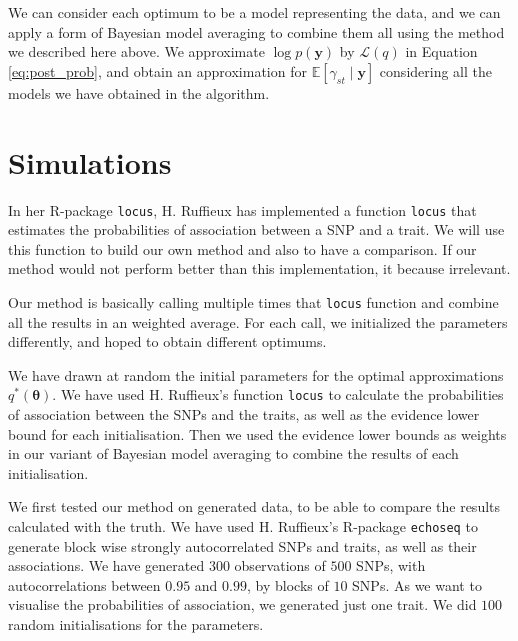 \documentclass[a4paper, 11pt]{report}
\numberwithin{equation}{section}
\begin{document}
We can consider each optimum to be a model representing the data, and we can apply a form of Bayesian model averaging to combine them all using the method we described here above. We approximate $\log p(\boldsymbol{y})$ by $\mathcal{L}(q)$ in Equation \ref{eq:post_prob}, and obtain an approximation for $\mathbb{E}\left[\gamma_{st}\mid \boldsymbol{y}\right]$ considering all the models we have obtained in the algorithm.
\newpage
\chapter{Simulations}
In her R-package \texttt{locus}, H. Ruffieux has implemented a function \texttt{locus} that estimates the probabilities of association between a SNP and a trait. We will use this function to build our own method and also to have a comparison. If our method would not perform better than this implementation, it because irrelevant.

Our method is basically calling multiple times that \texttt{locus} function and combine all the results in an weighted average. For each call, we initialized the parameters differently, and hoped to obtain different optimums.

We have drawn at random the initial parameters for the optimal approximations $q^*(\boldsymbol{\theta})$. We have used H. Ruffieux's function \texttt{locus} to calculate the probabilities of association between the SNPs and the traits, as well as the evidence lower bound for each initialisation. Then we used the evidence lower bounds as weights in our variant of Bayesian model averaging to combine the results of each initialisation.

We first tested our method on generated data, to be able to compare the results calculated with the truth. We have used H. Ruffieux's R-package \texttt{echoseq} to generate block wise strongly autocorrelated SNPs and traits, as well as their associations. We have generated $300$ observations of $500$ SNPs, with autocorrelations between $0.95$ and $0.99$, by blocks of $10$ SNPs. As we want to visualise the probabilities of association, we generated just one trait. We did $100$ random initialisations for the parameters.
\end{document}
